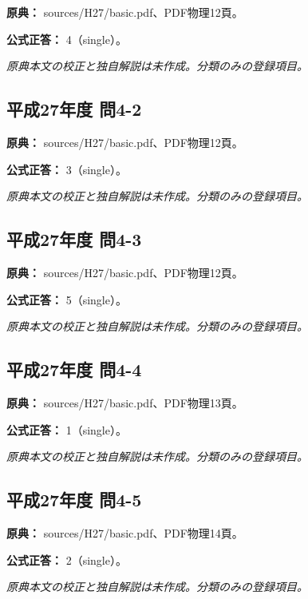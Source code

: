 \noindent\textbf{原典：} sources/H27/basic.pdf、PDF物理12頁。

\textbf{公式正答：} 4（single）。

\par\textit{原典本文の校正と独自解説は未作成。分類のみの登録項目。}

\subsection{平成27年度 問4-2}
\label{q:h27-reg-basic-4-2}

\noindent\textbf{原典：} sources/H27/basic.pdf、PDF物理12頁。

\textbf{公式正答：} 3（single）。

\par\textit{原典本文の校正と独自解説は未作成。分類のみの登録項目。}

\subsection{平成27年度 問4-3}
\label{q:h27-reg-basic-4-3}

\noindent\textbf{原典：} sources/H27/basic.pdf、PDF物理12頁。

\textbf{公式正答：} 5（single）。

\par\textit{原典本文の校正と独自解説は未作成。分類のみの登録項目。}

\subsection{平成27年度 問4-4}
\label{q:h27-reg-basic-4-4}

\noindent\textbf{原典：} sources/H27/basic.pdf、PDF物理13頁。

\textbf{公式正答：} 1（single）。

\par\textit{原典本文の校正と独自解説は未作成。分類のみの登録項目。}

\subsection{平成27年度 問4-5}
\label{q:h27-reg-basic-4-5}

\noindent\textbf{原典：} sources/H27/basic.pdf、PDF物理14頁。

\textbf{公式正答：} 2（single）。

\par\textit{原典本文の校正と独自解説は未作成。分類のみの登録項目。}

